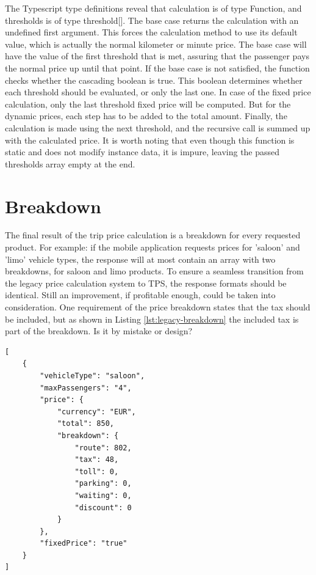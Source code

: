 The Typescript type definitions reveal that calculation is of type Function, and thresholds is of type threshold[]. The base case returns the calculation with an undefined first argument. This forces the calculation method to use its default value, which is actually the normal kilometer or minute price. The base case will have the value of the first threshold that is met, assuring that the passenger pays the normal price up until that point. If the base case is not satisfied, the function checks whether the cascading boolean is true. This boolean determines whether each threshold should be evaluated, or only the last one. In case of the fixed price calculation, only the last threshold fixed price will be computed. But for the dynamic prices, each step has to be added to the total amount. Finally, the calculation is made using the next threshold,  and the recursive call is summed up with the calculated price. It is worth noting that even though this function is static and does not modify instance data, it is impure, leaving the passed thresholds array empty at the end.


\section{Breakdown}
The final result of the trip price calculation is a breakdown for every requested product. For example: if the mobile application requests prices for 'saloon' and 'limo' vehicle types, the response will at most contain an array with two breakdowns, for saloon and limo products. To ensure a seamless transition from the legacy price calculation system to TPS, the response formats should be identical. Still an improvement, if profitable enough, could be taken into consideration. One requirement of the price breakdown states that the tax should be included, but as shown in Listing \ref{lst:legacy-breakdown} the included tax is part of the breakdown. Is it by mistake or design?

\begin{lstlisting}[caption={Legacy price breakdown}, label={lst:legacy-breakdown}]
[
	{
		"vehicleType": "saloon",
		"maxPassengers": "4",
		"price": {
			"currency": "EUR",
			"total": 850,
			"breakdown": {
				"route": 802,
				"tax": 48,
				"toll": 0,
				"parking": 0,
				"waiting": 0,
				"discount": 0
			}
		},
		"fixedPrice": "true"
	}
]
\end{lstlisting}

